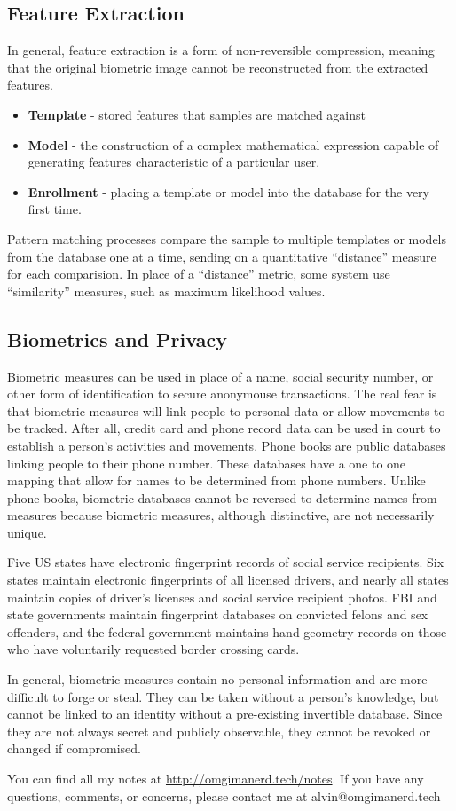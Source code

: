 \documentclass{math}
\begin{document}
\subsection*{Feature Extraction}
In general, feature extraction is a form of non-reversible compression,
meaning that the original biometric image cannot be reconstructed from the
extracted features.
\begin{itemize}
  \item \textbf{Template} - stored features that samples are matched against
  \item \textbf{Model} - the construction of a complex mathematical
    expression capable of generating features characteristic of a particular
    user.
  \item \textbf{Enrollment} - placing a template or model into the database for
    the very first time.
\end{itemize}
Pattern matching processes compare the sample to multiple templates or models
from the database one at a time, sending on a quantitative ``distance'' measure
for each comparision. In place of a ``distance'' metric, some system use
``similarity'' measures, such as maximum likelihood values.

\subsection*{Biometrics and Privacy}
Biometric measures can be used in place of a name, social security number, or
other form of identification to secure anonymouse transactions. The real fear is
that biometric measures will link people to personal data or allow movements to
be tracked. After all, credit card and phone record data can be used in court to
establish a person's activities and movements. Phone books are public databases
linking people to their phone number. These databases have a one to one mapping
that allow for names to be determined from phone numbers. Unlike phone books,
biometric databases cannot be reversed to determine names from measures because
biometric measures, although distinctive, are not necessarily unique. \par
Five US states have electronic fingerprint records of social service recipients.
Six states maintain electronic fingerprints of all licensed drivers, and nearly
all states maintain copies of driver's licenses and social service recipient
photos. FBI and state governments maintain fingerprint databases on convicted
felons and sex offenders, and the federal government maintains hand geometry
records on those who have voluntarily requested border crossing cards. \par
In general, biometric measures contain no personal information and are more
difficult to forge or steal. They can be taken without a person's knowledge,
but cannot be linked to an identity without a pre-existing invertible database.
Since they are not always secret and publicly observable, they cannot be
revoked or changed if compromised.

\begin{center}
  You can find all my notes at \url{http://omgimanerd.tech/notes}. If you have
  any questions, comments, or concerns, please contact me at
  alvin@omgimanerd.tech
\end{center}
\end{document}
